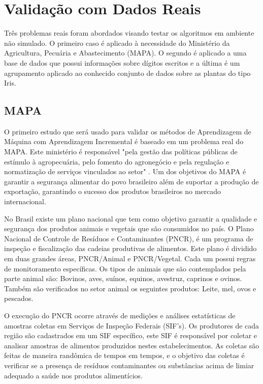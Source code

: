 \chapter{Validação com Dados Reais}
Três problemas reais foram abordados visando testar os algoritmos em ambiente não simulado. O primeiro caso é aplicado à necessidade do Ministério da Agricultura, Pecuária e Abastecimento (MAPA). O segundo é aplicado a uma base de dados que possui informações sobre dígitos escritos e a última é um agrupamento aplicado ao conhecido conjunto de dados sobre as plantas do tipo Iris.  

\section{MAPA}
O primeiro estudo que será usado para validar os métodos de Aprendizagem de Máquina com Aprendizagem Incremental é baseado em um problema real do MAPA. Este ministério é responsável  "pela gestão das políticas públicas de estímulo à agropecuária, pelo fomento do agronegócio e pela regulação e normatização de serviços vinculados ao setor" \cite{mapa}. Um dos objetivos do MAPA é garantir a segurança alimentar do povo brasileiro além de suportar a produção de exportação, garantindo o sucesso dos produtos brasileiros no mercado internacional.

No Brasil existe um plano nacional que tem como objetivo garantir a qualidade e segurança dos produtos animais e vegetais que são consumidos no país. O Plano Nacional de Controle de Resíduos e Contaminantes (PNCR), é um programa de inspeção e fiscalização das cadeias produtivas de alimentos. Este plano é dividido em duas grandes áreas, PNCR/Animal e PNCR/Vegetal. Cada um possui regras de monitoramento específicas. Os tipos de animais que são contemplados pela parte animal são: Bovinos, aves, suínos, equinos, avestruz, caprinos e ovinos. Também são verificados no setor animal os seguintes produtos: Leite, mel, ovos e pescados. 

O execução do PNCR ocorre através de medições e análises estatísticas de amostras coletas em Serviços de Inspeção Federais (SIF's). Os produtores de cada região são cadastrados em um SIF específico, este SIF é responsável por coletar e analisar amostras de alimentos produzidos nestes estabelecimentos. As coletas são feitas de maneira randômica de tempos em tempos, e o objetivo das coletas é verificar se a presença de resíduos contaminantes ou substâncias acima de limiar adequado a saúde nos produtos alimentícios. 

